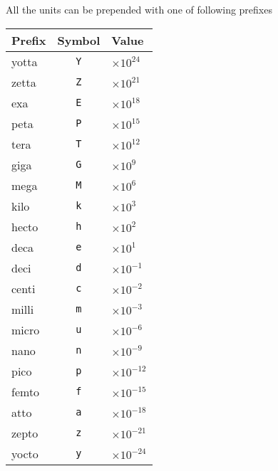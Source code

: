 \documentclass[a4paper,10pt]{article}
\begin{document}
All the units can be prepended with one of following prefixes

\begin{center}
\begin{tabular}{lcl}
Prefix & Symbol & Value \\
\hline
    yotta    &\texttt{Y} &     $\times10^{24}$ \\
    zetta    &\texttt{Z} &     $\times10^{21}$ \\
    exa      &\texttt{E} &     $\times10^{18}$ \\
    peta     &\texttt{P} &     $\times10^{15}$ \\
    tera     &\texttt{T} &     $\times10^{12}$ \\
    giga     &\texttt{G} &     $\times10^{9}$ \\
    mega     &\texttt{M} &     $\times10^{6}$ \\
    kilo     &\texttt{k} &     $\times10^{3}$ \\
    hecto    &\texttt{h} &     $\times10^{2}$ \\
    deca     &\texttt{e} &     $\times10^{1}$ \\
    deci     &\texttt{d} &     $\times10^{-1}$ \\
    centi    &\texttt{c} &     $\times10^{-2}$ \\
    milli    &\texttt{m} &     $\times10^{-3}$ \\
    micro    &\texttt{u} &     $\times10^{-6}$ \\
    nano     &\texttt{n} &     $\times10^{-9}$ \\
    pico     &\texttt{p} &     $\times10^{-12}$ \\
    femto    &\texttt{f} &     $\times10^{-15}$ \\
    atto     &\texttt{a} &     $\times10^{-18}$ \\
    zepto    &\texttt{z} &     $\times10^{-21}$ \\
    yocto    &\texttt{y} &     $\times10^{-24}$ \\
\hline
\end{tabular}
\end{center}
\end{document}
